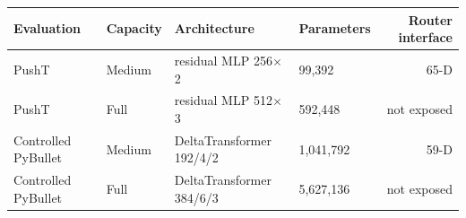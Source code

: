 \begin{tabular}{llllr}
\toprule
Evaluation & Capacity & Architecture & Parameters & Router interface \\
\midrule
PushT & Medium & residual MLP 256$\times$2 & 99,392 & 65-D \\
PushT & Full & residual MLP 512$\times$3 & 592,448 & not exposed \\
Controlled PyBullet & Medium & DeltaTransformer 192/4/2 & 1,041,792 & 59-D \\
Controlled PyBullet & Full & DeltaTransformer 384/6/3 & 5,627,136 & not exposed \\
\bottomrule
\end{tabular}
